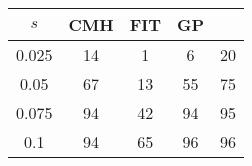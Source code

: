\centering \begin{tabular}{c|c|c|c|c}
$s$	&CMH	&FIT	&GP	&\sc{Clear}\\\hline
0.025	&14	&1	&6	&20\\
0.05	&67	&13	&55	&75\\
0.075	&94	&42	&94	&95\\
0.1	&94	&65	&96	&96\\
\end{tabular}
